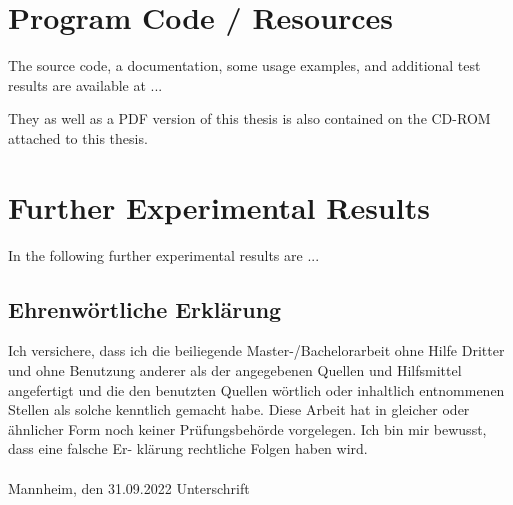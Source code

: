 \documentclass[11pt,titlepage,oneside,openany]{book}
\begin{document}




\appendix

\chapter{Program Code / Resources}
\label{cha:appendix-a}

The source code, a documentation, some usage examples, and additional test results are available at ...

They as well as a PDF version of this thesis is also contained on the CD-ROM attached to this thesis.

\chapter{Further Experimental Results}
\label{cha:appendix-b}

In the following further experimental results are ...


\newpage


\pagestyle{empty}


\section*{Ehrenw\"ortliche Erkl\"arung}
Ich versichere, dass ich die beiliegende Master-/Bachelorarbeit ohne Hilfe Dritter
und ohne Benutzung anderer als der angegebenen Quellen und Hilfsmittel
angefertigt und die den benutzten Quellen w\"ortlich oder inhaltlich
entnommenen Stellen als solche kenntlich gemacht habe. Diese Arbeit
hat in gleicher oder \"ahnlicher Form noch keiner Pr\"ufungsbeh\"orde
vorgelegen. Ich bin mir bewusst, dass eine falsche Er- kl\"arung rechtliche Folgen haben
wird.
\\
\\

\noindent
Mannheim, den 31.09.2022 \hspace{4cm} Unterschrift
\end{document}
